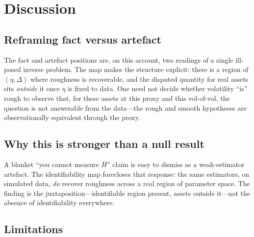 \documentclass[11pt]{article}
\begin{document}
\section{Discussion}

\subsection{Reframing fact versus artefact}

The fact and artefact positions are, on this account, two readings of a single
ill-posed inverse problem. The map makes the structure explicit: there is a region
of $(\eta, \Delta)$ where roughness is recoverable, and the disputed quantity for
real assets sits \emph{outside} it once $\eta$ is fixed to data. One need not decide
whether volatility ``is'' rough to observe that, for these assets at this proxy and
this vol-of-vol, the question is not answerable from the data---the rough and smooth
hypotheses are observationally equivalent through the proxy.

\subsection{Why this is stronger than a null result}

A blanket ``you cannot measure $H$'' claim is easy to dismiss as a weak-estimator
artefact. The identifiability map forecloses that response: the same estimators, on
simulated data, \emph{do} recover roughness across a real region of parameter space.
The finding is the juxtaposition---identifiable region present, assets outside
it---not the absence of identifiability everywhere.

\subsection{Limitations}
\label{sec:limitations}
\end{document}
